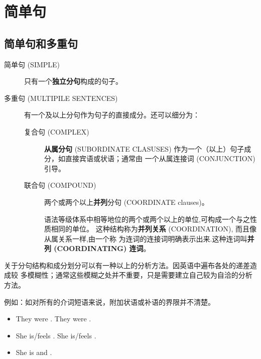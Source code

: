 \section{简单句}

\subsection{简单句和多重句}

\begin{description}
	\item[简单句 (SIMPLE)] 只有一个\textbf{独立分句}构成的句子。

\item[多重句 (MULTIPILE SENTENCES)] 有一个及以上分句作为句子的直接成分。还可以细分为：
  \begin{description}
  \item[复合句 (COMPLEX)]  \textbf{从属分句}
    (SUBORDINATE CLASUSES) 作为一个（以上）句子成分，如直接宾语或状语；通常由
    一个从属连接词 (CONJUNCTION) 引导。

  \item[联合句 (COMPOUND)] 两个或两个以上\textbf{并列}分句 (COORDINATE
    clauses)。 


    语法等级体系中相等地位的两个或两个以上的单位,可构成一个与之性质相同的单位。
    这种结构称为\textbf{并列关系} (COORDINATION), 而且像从属关系一样,由一个称
    为连词的连接词明确表示出来.这种连词叫\textbf{并列 (COORDINATING) 连词}。
  \end{description}
\end{description}


关于分句结构和成分划分可以有一种以上的分析方法。因英语中遍布各处的递差造成较
多模糊性；通常这些模糊之处并不重要，只是需要建立自己较为自洽的分析方法。

例如：如对所有的介词短语来说，附加状语或补语的界限并不清楚。
\begin{itemize}
\item They were . \qquad  They were .
\item She is/feels . \qquad  She is/feels .

\item She is  and .
\end{itemize}

